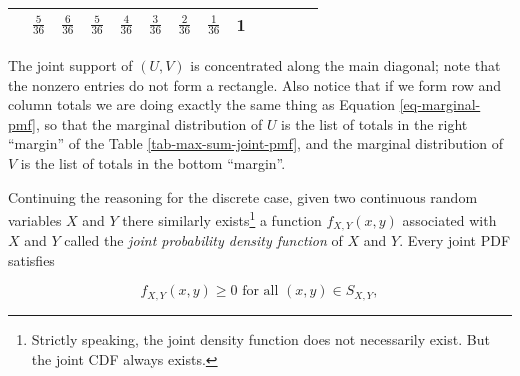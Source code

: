 \documentclass[]{book}
\let\rmarkdownfootnote\footnote%
\def\footnote{\protect\rmarkdownfootnote}
\numberwithin{equation}{chapter}
\numberwithin{figure}{chapter}
\theoremstyle{plain}
\theoremstyle{definition}
\theoremstyle{remark}
\theoremstyle{definition}
\theoremstyle{definition}
\theoremstyle{remark}
\begin{document}
\begin{longtable}[]{@{}lllllllllllll@{}}
\begin{minipage}[t]{0.05\columnwidth}
\end{minipage} & \begin{minipage}[t]{0.05\columnwidth}\raggedright\strut
\(\frac{5}{36}\)\strut
\end{minipage} & \begin{minipage}[t]{0.05\columnwidth}\raggedright\strut
\(\frac{6}{36}\)\strut
\end{minipage} & \begin{minipage}[t]{0.05\columnwidth}\raggedright\strut
\(\frac{5}{36}\)\strut
\end{minipage} & \begin{minipage}[t]{0.05\columnwidth}\raggedright\strut
\(\frac{4}{36}\)\strut
\end{minipage} & \begin{minipage}[t]{0.05\columnwidth}\raggedright\strut
\(\frac{3}{36}\)\strut
\end{minipage} & \begin{minipage}[t]{0.05\columnwidth}\raggedright\strut
\(\frac{2}{36}\)\strut
\end{minipage} & \begin{minipage}[t]{0.05\columnwidth}\raggedright\strut
\(\frac{1}{36}\)\strut
\end{minipage} & \begin{minipage}[t]{0.06\columnwidth}\raggedright\strut
1\strut
\end{minipage}\tabularnewline
\bottomrule
\end{longtable}

The joint support of \((U,V)\) is concentrated along the main diagonal;
note that the nonzero entries do not form a rectangle. Also notice that
if we form row and column totals we are doing exactly the same thing as
Equation \eqref{eq-marginal-pmf}, so that the marginal distribution of
\(U\) is the list of totals in the right ``margin'' of the Table
\ref{tab-max-sum-joint-pmf}, and the marginal distribution of \(V\) is
the list of totals in the bottom ``margin''.

\newpage

Continuing the reasoning for the discrete case, given two continuous
random variables \(X\) and \(Y\) there similarly exists\footnote{Strictly
  speaking, the joint density function does not necessarily exist. But
  the joint CDF always exists.} a function \(f_{X,Y}(x,y)\) associated
with \(X\) and \(Y\) called the \emph{joint probability density
function} of \(X\) and \(Y\). Every joint PDF satisfies

\begin{equation}
f_{X,Y}(x,y)\geq0\mbox{ for all }(x,y)\in S_{X,Y},
\end{equation}
\end{document}

